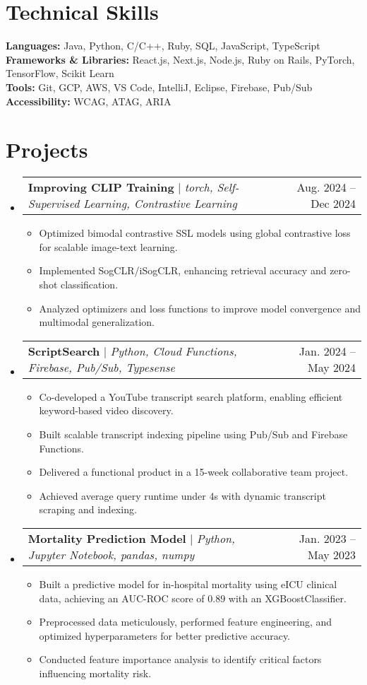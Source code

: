 \documentclass[letterpaper,12pt]{article}
\makeatletter
\newcommand{\resumeItem}[1]{
  \item\small{
    {#1 \vspace{-2pt}}
  }
}
\newcommand{\resumeProjectHeading}[2]{
    \item
    \begin{tabular*}{0.97\textwidth}{l@{\extracolsep{\fill}}r}
      \small#1 & #2 \\
    \end{tabular*}\vspace{-7pt}
}
\newcommand{\resumeSubHeadingListStart}{\begin{itemize}[leftmargin=0pt, label={}]}
\newcommand{\resumeSubHeadingListEnd}{\end{itemize}}
\newcommand{\resumeItemListStart}{\begin{itemize}[leftmargin=10pt]}
\newcommand{\resumeItemListEnd}{\end{itemize}\vspace{-10pt}}
\makeatother
\begin{document}
%
\section{Technical Skills}
\textbf{Languages:} Java, Python, C/C++, Ruby, SQL, JavaScript, TypeScript \\
\textbf{Frameworks \& Libraries:} React.js, Next.js, Node.js, Ruby on Rails, PyTorch, TensorFlow, Scikit Learn \\
\textbf{Tools:} Git, GCP, AWS, VS Code, IntelliJ, Eclipse, Firebase, Pub/Sub \\
\textbf{Accessibility:} WCAG, ATAG, ARIA \\


\vspace{-5pt}
\section{Projects}
    \resumeSubHeadingListStart
        \resumeProjectHeading
        {\textbf{Improving CLIP Training} $|$ \emph{torch, Self-Supervised Learning, Contrastive Learning}}{Aug. 2024 -- Dec 2024}
        \resumeItemListStart
            \resumeItem{Optimized bimodal contrastive SSL models using global contrastive loss for scalable image-text learning.}
            \resumeItem{Implemented SogCLR/iSogCLR, enhancing retrieval accuracy and zero-shot classification.}
            \resumeItem{Analyzed optimizers and loss functions to improve model convergence and multimodal generalization.}
        \resumeItemListEnd
        
        \resumeProjectHeading
        {\textbf{ScriptSearch} $|$ \emph{Python, Cloud Functions, Firebase, Pub/Sub, Typesense}}{Jan. 2024 -- May 2024}
        \resumeItemListStart
            \resumeItem{Co-developed a YouTube transcript search platform, enabling efficient keyword-based video discovery.}
            \resumeItem{Built scalable transcript indexing pipeline using Pub/Sub and Firebase Functions.}
            \resumeItem{Delivered a functional product in a 15-week collaborative team project.}
            \resumeItem{Achieved average query runtime under 4s with dynamic transcript scraping and indexing.}
        \resumeItemListEnd

        \resumeProjectHeading
        {\textbf{Mortality Prediction Model} $|$ \emph{Python, Jupyter Notebook, pandas, numpy}}{Jan. 2023 -- May 2023}
        \resumeItemListStart
            \resumeItem{Built a predictive model for in-hospital mortality using eICU clinical data, achieving an AUC-ROC score of $0.89$ with an XGBoostClassifier.}
            \resumeItem{Preprocessed data meticulously, performed feature engineering, and optimized hyperparameters for better predictive accuracy.}
            \resumeItem{Conducted feature importance analysis to identify critical factors influencing mortality risk.}
        \resumeItemListEnd
    \resumeSubHeadingListEnd

\end{document}
